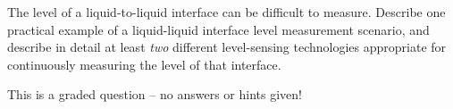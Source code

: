 

The level of a liquid-to-liquid interface can be difficult to measure.  Describe one practical example of a liquid-liquid interface level measurement scenario, and describe in detail at least {\it two} different level-sensing technologies appropriate for continuously measuring the level of that interface.

\vfil 

\eject






This is a graded question -- no answers or hints given!












